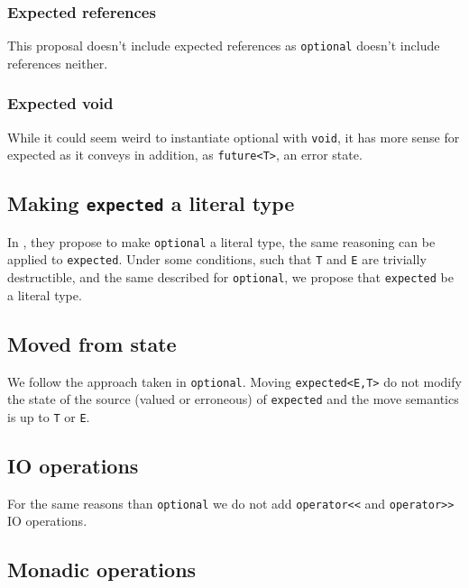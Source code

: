 \documentclass[a4paper,10pt]{article}
\newcommand{\cpp}[1]{\lstinline{#1}}
\begin{document}
\subsubsection{Expected references}

This proposal doesn't include expected references as \cpp{optional}\cite{OptionalRev5} doesn't include references neither.

\subsubsection{Expected void}

While it could seem weird to instantiate optional with \cpp{void}, it has more sense for expected as it conveys in addition, as \cpp{future<T>}, an error state.

\subsection{Making \cpp{expected} a literal type}

In \cite{OptionalRev4}, they propose to make \cpp{optional} a literal type, the same reasoning can be applied to \cpp{expected}. Under some conditions, such that \cpp{T} and \cpp{E} are trivially destructible, and the same described for \cpp{optional}, we propose that \cpp{expected} be a literal type.

\subsection{Moved from state}

We follow the approach taken in \cpp{optional}\cite{OptionalRev4}. Moving \cpp{expected<E,T>} do not modify the state of the source (valued or erroneous) of \cpp{expected} and the move semantics is up to \cpp{T} or \cpp{E}.

\subsection{IO operations}

For the same reasons than \cpp{optional}\cite{OptionalRev4} we do not add \cpp{operator<<} and \cpp{operator>>} IO operations.

\subsection{Monadic operations}
\label{monadic-operations}
\end{document}
